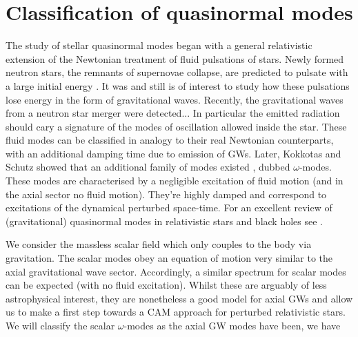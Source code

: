 \documentclass[aps,prd,longbibliography,reprint,twocolumn,amsmath,amssymb,amsfonts,showpacs,superscriptaddress]{revtex4-1}%
\begin{document}
\section{Classification of quasinormal modes}

The study of stellar quasinormal modes began with a general relativistic extension of the Newtonian treatment of fluid pulsations of stars. Newly formed neutron stars, the remnants of supernovae collapse, are predicted to pulsate with a large initial energy \cite{thorne1967non}. It was and still is of interest to study how these pulsations lose energy in the form of gravitational waves. Recently, the gravitational waves from a neutron star merger were detected... In particular the emitted radiation should cary a signature of the modes of oscillation allowed inside the star. These fluid modes can be classified in analogy to their real Newtonian counterparts, with an additional damping time due to emission of GWs. Later, Kokkotas and Schutz showed that an additional family of modes existed \cite{Kokkotas:1986gd,Kokkotas:1992ka}, dubbed $\omega$-modes. These modes are characterised by a negligible excitation of fluid motion (and in the axial sector no fluid motion). They're highly damped and correspond to excitations of the dynamical perturbed space-time. For an excellent review of (gravitational) quasinormal modes in relativistic stars and black holes see \cite{Kokkotas:1999bd}.

We consider the massless scalar field which only couples to the body via gravitation. The scalar modes obey an equation of motion very similar to the axial gravitational wave sector. Accordingly, a similar spectrum for scalar modes can be expected (with no fluid excitation). Whilst these are arguably of less astrophysical interest, they are nonetheless a good model for axial GWs and allow us to make a first step towards a CAM approach for perturbed relativistic stars. We will classify the scalar $\omega$-modes as the axial GW modes have been, we have
\end{document}
